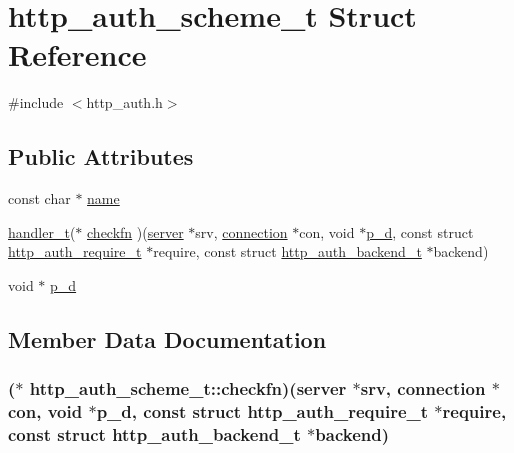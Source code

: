 \hypertarget{structhttp__auth__scheme__t}{\section{http\-\_\-auth\-\_\-scheme\-\_\-t Struct Reference}
\label{structhttp__auth__scheme__t}
}


{\ttfamily \#include $<$http\-\_\-auth.\-h$>$}

\subsection*{Public Attributes}
\begin{DoxyCompactItemize}
\item 
const char $\ast$ \hyperlink{structhttp__auth__scheme__t_ab3a76aa973d863c7f41adc0e54b77f53}{name}
\item 
\hyperlink{settings_8h_a2a8ffc3e29980db202f39ab85ab7e98e}{handler\-\_\-t}($\ast$ \hyperlink{structhttp__auth__scheme__t_aeaca25f3541b8f6e13435a0793cc91f2}{checkfn} )(\hyperlink{structserver}{server} $\ast$srv, \hyperlink{structconnection}{connection} $\ast$con, void $\ast$\hyperlink{structhttp__auth__scheme__t_a1c725453188cffd8054f97fcf7ef5a8b}{p\-\_\-d}, const struct \hyperlink{structhttp__auth__require__t}{http\-\_\-auth\-\_\-require\-\_\-t} $\ast$require, const struct \hyperlink{structhttp__auth__backend__t}{http\-\_\-auth\-\_\-backend\-\_\-t} $\ast$backend)
\item 
void $\ast$ \hyperlink{structhttp__auth__scheme__t_a1c725453188cffd8054f97fcf7ef5a8b}{p\-\_\-d}
\end{DoxyCompactItemize}


\subsection{Member Data Documentation}
\hypertarget{structhttp__auth__scheme__t_aeaca25f3541b8f6e13435a0793cc91f2}{
\subsubsection[{checkfn}]{($\ast$ http\-\_\-auth\-\_\-scheme\-\_\-t\-::checkfn)({\bf server} $\ast$srv, {\bf connection} $\ast$con, void $\ast${\bf p\-\_\-d}, const struct {\bf http\-\_\-auth\-\_\-require\-\_\-t} $\ast$require, const struct {\bf http\-\_\-auth\-\_\-backend\-\_\-t} $\ast$backend)}}\label{structhttp__auth__scheme__t_aeaca25f3541b8f6e13435a0793cc91f2}


